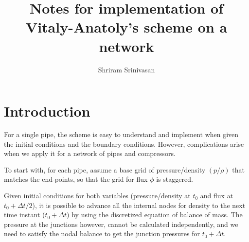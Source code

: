 \documentclass{amsart}
\begin{document}
\title{Notes for implementation  of Vitaly-Anatoly's scheme on a network}

\author{Shriram Srinivasan}
\address{LANL}




\maketitle

\section{Introduction}

For a single pipe, the scheme is easy to understand and implement when given the initial conditions and the boundary conditions. However,  complications arise when we apply it for a network of pipes and compressors.

To start with, for each pipe, assume a base grid  of  pressure/density $(p/\rho)$ that matches the end-points, so that the grid for flux $\phi$ is staggered.  

Given initial conditions for both variables (pressure/density at $t_0$ and flux at $t_0 + \Delta t/2$), it is possible to advance all the internal nodes for density to the next time instant ($t_0 + \Delta t$) by using the discretized equation of balance of mass.  The pressure at the junctions however, cannot be calculated independently, and we need to satisfy the nodal balance to get the junction pressures for $t_0 + \Delta t$.
\end{document}

